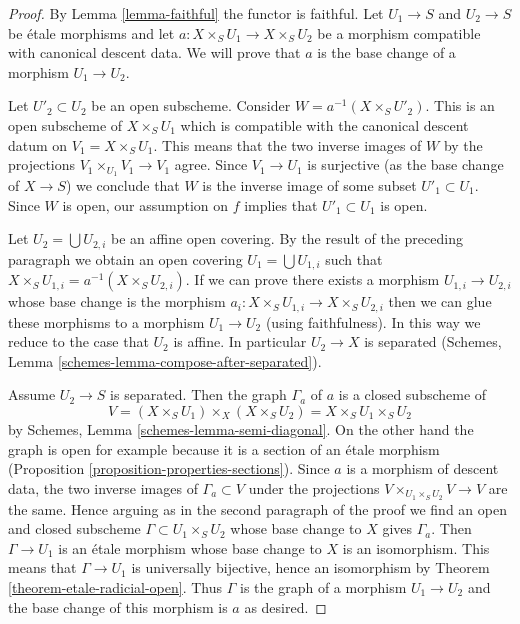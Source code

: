 \begin{proof}
By Lemma \ref{lemma-faithful} the functor is faithful.
Let $U_1 \to S$ and $U_2 \to S$ be \'etale morphisms
and let $a : X \times_S U_1 \to X \times_S U_2$ be a
morphism compatible with canonical descent data.
We will prove that $a$ is the base change of a morphism $U_1 \to U_2$.

\medskip\noindent
Let $U'_2 \subset U_2$ be an open subscheme. Consider
$W = a^{-1}(X \times_S U'_2)$. This is an open subscheme
of $X \times_S U_1$ which is compatible with the canonical
descent datum on $V_1 = X \times_S U_1$. This means that the
two inverse images of $W$ by the projections
$V_1 \times_{U_1} V_1 \to V_1$ agree. Since $V_1 \to U_1$
is surjective (as the base change of $X \to S$) we conclude
that $W$ is the inverse image of some subset $U'_1 \subset U_1$.
Since $W$ is open, our assumption on $f$ implies that $U'_1 \subset U_1$
is open.

\medskip\noindent
Let $U_2 = \bigcup U_{2, i}$ be an affine open covering.
By the result of the preceding paragraph we obtain an open
covering $U_1 = \bigcup U_{1, i}$ such that
$X \times_S U_{1, i} = a^{-1}(X \times_S U_{2, i})$.
If we can prove there exists a morphism $U_{1, i} \to U_{2, i}$
whose base change is the morphism
$a_i : X \times_S U_{1, i} \to X \times_S U_{2, i}$
then we can glue these morphisms to a morphism $U_1 \to U_2$
(using faithfulness). In this way we reduce to the case that
$U_2$ is affine. In particular $U_2 \to X$ is separated
(Schemes, Lemma \ref{schemes-lemma-compose-after-separated}).

\medskip\noindent
Assume $U_2 \to S$ is separated. Then the graph $\Gamma_a$ of $a$
is a closed subscheme of
$$
V = (X \times_S U_1) \times_X (X \times_S U_2) = X \times_S U_1 \times_S U_2
$$
by Schemes, Lemma \ref{schemes-lemma-semi-diagonal}.
On the other hand the graph is open for example
because it is a section of an \'etale morphism
(Proposition \ref{proposition-properties-sections}).
Since $a$ is a morphism of descent data, the two inverse images of
$\Gamma_a \subset V$ under the projections
$V \times_{U_1 \times_S U_2} V \to V$ are the same.
Hence arguing as in the second paragraph of the proof we
find an open and closed subscheme $\Gamma \subset U_1 \times_S U_2$
whose base change to $X$ gives $\Gamma_a$. Then
$\Gamma \to U_1$ is an \'etale morphism whose base change
to $X$ is an isomorphism. This means that $\Gamma \to U_1$
is universally bijective, hence an isomorphism
by Theorem \ref{theorem-etale-radicial-open}.
Thus $\Gamma$ is the graph of a morphism $U_1 \to U_2$
and the base change of this morphism is $a$ as desired.
\end{proof}

